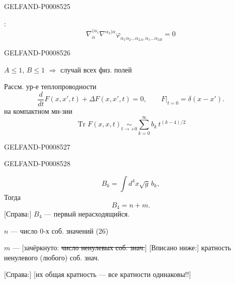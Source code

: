 \begin{GelfandAdjacentEvidence}{GELFAND-P000852}{5}


:
\[
\nabla_{\dot\alpha}^{(\alpha_1}\nabla^{\alpha_2)\dot\alpha}
\varphi_{\alpha_1\alpha_2\ldots\alpha_{2A},\dot\alpha_1\ldots\dot\alpha_{2B}}=0
\tag{27}
\]
\end{GelfandAdjacentEvidence}
\begin{GelfandAdjacentEvidence}{GELFAND-P000852}{6}

\(A\leq1\), \(B\leq1\) \(\Rightarrow\) случай всех физ. полей

Рассм. ур-е теплопроводности
\[
\frac{d}{dt}F(x,x',t)+\Delta F(x,x',t)=0,\qquad
F\big|_{t=0}=\delta(x-x').\tag{28}
\]
на компактном мн-зии
\[
\operatorname{Tr}F(x,x,t)\underset{t\to+0}{\sim}
\sum_{k=0}^{\infty}b_k\,t^{(k-4)/2}\tag{29}
\]
\end{GelfandAdjacentEvidence}
\begin{GelfandAdjacentEvidence}{GELFAND-P000852}{7}

\end{GelfandAdjacentEvidence}
\begin{GelfandAdjacentEvidence}{GELFAND-P000852}{8}

\[
B_k=\int d^4x\sqrt{g}\,b_k,\tag{30}
\]
Тогда
\[
B_4=n+m.\tag{31}
\]
[Справа:] \(B_4\) — первый нерасходящийся.

\(n\) — число 0-х соб. значений (26)

\(m\) — [зачёркнуто: \sout{число ненулевых соб. знач.}]
[Вписано ниже:] кратность ненулевого (любого) соб. знач.

[Справа:] [их общая кратность — все кратности одинаковы!!]
\end{GelfandAdjacentEvidence}
